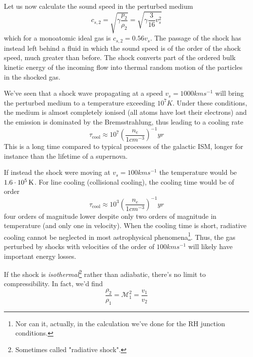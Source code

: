 \par Let us now calculate the sound speed in the perturbed medium
\begin{equation*}
    c_{s,2} = \sqrt{\gamma\frac{p_{2}}{\rho_{2}}} = \sqrt{\gamma\frac{3}{16}v_{s}^{2}}
\end{equation*}
which for a monoatomic ideal gas is $c_{s,2} = 0.56v_{s}$. The passage of the shock has instead left behind a fluid in which the sound speed is of the order of the shock speed, much greater than before. The shock converts part of the ordered bulk kinetic energy of the incoming flow into thermal random motion of the particles in the shocked gas.
\par We've seen that a shock wave propagating at a speed $v_{s}=1000\unit{km}\unit{s}^{-1}$ will bring the perturbed medium to a temperature exceeding $10^{7}\unit{K}$. Under these conditions, the medium is almost completely ionised (all atoms have lost their electrons) and the emission is dominated by the Bremsstrahlung, thus leading to a cooling rate
\begin{equation*}
    \tau_{\text{cool}} \approx 10^{7} \left(\frac{n_{e}}{1\unit{cm}^{-3}}\right)^{-1}\unit{yr}
\end{equation*}
This is a long time compared to typical processes of the galactic ISM, longer for instance than the lifetime of a supernova.
\par If instead the shock were moving at $v_{s} = 100\unit{km}\unit{s}^{-1}$ the temperature would be $1.6\cdot 10^{5}\,\text{K}$. For line cooling (collisional cooling), the cooling time would be of order 
\begin{equation*}
    \tau_{\text{cool}} \approx 10^{3} \left(\frac{n_{e}}{1\unit{cm}^{-3}}\right)^{-1}\unit{yr}
\end{equation*}
four orders of magnitude lower despite only two orders of magnitude in temperature (and only one in velocity). When the cooling time is short, radiative cooling cannot be neglected in most astrophysical phenomena\footnote{Nor can it, actually, in the calculation we've done for the RH junction conditions.}. Thus, the gas perturbed by shocks with velocities of the order of $100\unit{km}\unit{s}^{-1}$ will likely have important energy losses.
\par If the shock is \emph{isothermal}\footnote{Sometimes called "radiative shock".} rather than adiabatic, there's no limit to compressibility. In fact, we'd find
\begin{equation*}
    \frac{\rho_{2}}{\rho_{1}} = \mathcal{M}_{1}^{2} = \frac{v_{1}}{v_{2}}
\end{equation*}
